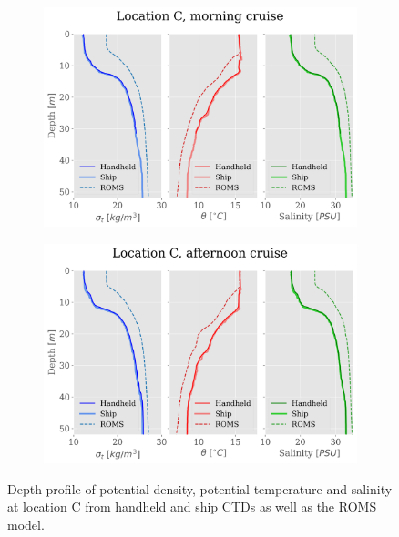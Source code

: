 \documentclass[a4paper,10pt,english]{article}
\begin{document}
\begin{figure}[H]
    \begin{adjustwidth}{-2.5cm}{-2.5cm}  %
    \begin{subfigure}{0.65\textwidth}
            \centering
            \includegraphics[width=1.\linewidth]{../figures/combined_profiles/Location_C_morning_cruise.png}
            \caption{}
            \label{fig:morning_C}
    \end{subfigure}%
    \begin{subfigure}{0.65\textwidth}
            \centering
            \includegraphics[width=1.\linewidth]{../figures/combined_profiles/Location_C_afternoon_cruise.png}
            \caption{}
            \label{fig:afternoon_C}
    \end{subfigure}
    \end{adjustwidth}
    
    \caption{Depth profile of potential density, potential temperature and salinity at location C from handheld and ship CTDs as well as the ROMS model.}
    \label{fig:location_C}
\end{figure}
\end{document}
